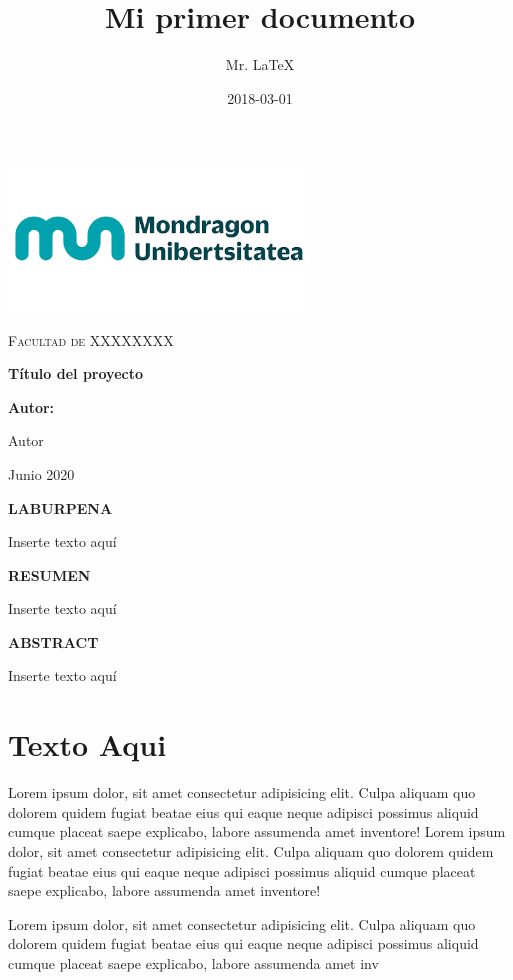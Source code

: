 \documentclass[12pt]{article}
\title{Mi primer documento}
\date{2018-03-01}
\author{Mr. LaTeX}
\begin{document}
	\begin{titlepage} %
		\centering
		{\includegraphics[width=0.6\textwidth]{im/logo}\par}
		{\scshape\Large Facultad de XXXXXXXX \par}
		\vspace{2cm}
		{\bfseries\LARGE Título del proyecto \par}
		\vspace{3cm}
		{\bfseries\Large Autor: \par}
		{\Large Autor \par}
		\vfill
		{\Large Junio 2020 \par}
	\end{titlepage}
	\newpage
	
	\begin{center} %
	{\bfseries\Large LABURPENA \par}
	\end{center}
	
	Inserte texto aquí
	
	\begin{center} %
	{\bfseries\Large RESUMEN \par}
	\end{center}

	Inserte texto aquí

	\begin{center} %
	{\bfseries\Large ABSTRACT \par}
	\end{center}

	Inserte texto aquí

	\newpage
	\tableofcontents %
	\newpage
	
	\listoffigures %
	\newpage
	
	\listoftables %
	\newpage
	
	\section{Texto Aqui}
	Lorem ipsum dolor, sit amet consectetur adipisicing elit. Culpa aliquam quo dolorem quidem fugiat beatae eius qui eaque neque adipisci possimus aliquid cumque placeat saepe explicabo, labore assumenda amet inventore! Lorem ipsum dolor, sit amet consectetur adipisicing elit. Culpa aliquam quo dolorem quidem fugiat beatae eius qui eaque neque adipisci possimus aliquid cumque placeat saepe explicabo, labore assumenda amet inventore!\newline
	
	Lorem ipsum dolor, sit amet consectetur adipisicing elit. Culpa aliquam quo dolorem quidem fugiat beatae eius qui eaque neque adipisci possimus aliquid cumque placeat saepe explicabo, labore assumenda amet inv
\end{document}

